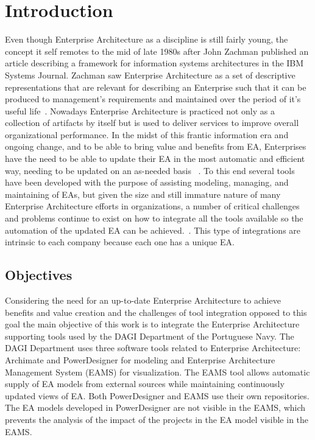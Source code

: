 \documentclass[runningheads]{llncs}
\begin{document}
\section{Introduction}
Even though Enterprise Architecture as a discipline is still fairly young, the concept it self remotes to the mid of late 1980s after John Zachman published an article describing a framework for information systems architectures in the IBM Systems Journal. Zachman saw Enterprise Architecture as a set of descriptive representations that are relevant for describing an Enterprise such that it can be produced to management's requirements and maintained over the period of it's useful life~\cite{ref_1}. Nowadays Enterprise Architecture is practiced not only as a collection of artifacts by itself but is used to deliver services to improve overall organizational performance. In the midst of this frantic information era and ongoing change, and to be able to bring value and benefits from EA, Enterprises have the need to be able to update their EA in the most automatic and efficient way, needing to be updated on an as-needed basis ~\cite{ref_2}. To this end several tools have been developed with the purpose of assisting modeling, managing, and maintaining of EAs, but given the size and still immature nature of many Enterprise Architecture efforts in organizations, a number of critical challenges and problems continue to exist on how to integrate all the tools available so the automation of the updated EA can be achieved.~\cite{ref_3}. This type of integrations are intrinsic to each company because each one has a unique EA.

\subsection{Objectives}
Considering the need for an up-to-date Enterprise Architecture to achieve benefits and value creation and the challenges of tool integration opposed to this goal the main objective of this work is to integrate the Enterprise Architecture supporting tools used by the DAGI Department of the Portuguese Navy.
The DAGI Department uses three software tools related to Enterprise Architecture: Archimate and PowerDesigner for modeling and Enterprise Architecture Management System (EAMS) for visualization. The EAMS tool allows automatic supply of EA models from external sources while maintaining continuously updated views of EA. Both PowerDesigner and EAMS use their own repositories. The EA models developed in PowerDesigner are not visible in the EAMS, which prevents the analysis of the impact of the projects in the EA model visible in the EAMS.
\end{document}
